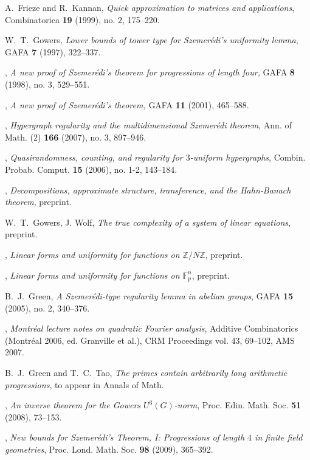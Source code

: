 \documentclass[11pt,reqno]{amsart}
\numberwithin{equation}{section}
\theoremstyle{plain}
\theoremstyle{definition}
\newcommand\Z{\mathbb{Z}}
\newcommand\F{\mathbb{F}}
\newcommand\1{{\bf 1}}
\newcommand\2{{\bf 2}}
\begin{document}
\begin{thebibliography}{99}
A.~Frieze and R.~Kannan, \emph{Quick approximation to matrices
and applications}, Combinatorica \textbf{19} (1999), no. 2,
175--220.

W.~T.~Gowers, \emph{Lower bounds of tower type for Szemer\'edi's uniformity lemma}, GAFA \textbf{7} (1997), 322--337.

\bysame, \emph{A new proof of Szemer\'edi's theorem for progressions of length four,} GAFA \textbf{8} (1998), 
no. 3, 529--551.

\bysame, \emph{A new proof of Szemer\'edi's theorem,} GAFA \textbf{11} (2001), 465--588. 

\bysame, \emph{Hypergraph regularity and the multidimensional Szemer\'edi theorem}, Ann. of Math. (2) \textbf{166} (2007), no. 3, 897--946.

\bysame, \emph{Quasirandomness, counting, and regularity for $3$-uniform hypergraphs}, Combin. Probab. Comput. \textbf{15} (2006), no. 1-2, 143--184.

\bysame, \emph{Decompositions, approximate structure, transference, and the Hahn-Banach theorem}, preprint.

W.~T.~Gowers, J. Wolf, \emph{The true complexity of a system of linear equations}, preprint.

\bysame, \emph{Linear forms and uniformity for functions on $\Z/N\Z$}, preprint.

\bysame, \emph{Linear forms and uniformity for functions on $\F_p^n$}, preprint.

B.~J.~Green, \emph{A Szemer\'edi-type regularity lemma in abelian groups}, GAFA \textbf{15} (2005), no. 2, 340--376.

\bysame, \emph{Montr\'eal lecture notes on quadratic Fourier analysis}, Additive Combinatorics (Montr\'eal 2006, ed. Granville et al.), CRM Proceedings vol. 43, 69--102, AMS 2007.

 B.~J.~Green and T.~C.~Tao, \emph{The primes contain arbitrarily long arithmetic progressions}, to appear in Annals of Math.

\bysame, \emph{An inverse theorem for the Gowers $U^3(G)$-norm}, Proc. Edin. Math. Soc. \textbf{51} (2008), 73--153.

\bysame, \emph{New bounds for Szemer\'edi's Theorem, I: Progressions of length $4$ in finite field geometries}, Proc. Lond. Math. Soc. \textbf{98} (2009), 365--392.


\end{thebibliography}
\end{document}
